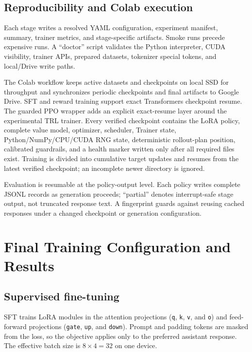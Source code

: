 \documentclass[11pt]{article}
\newcommand{\trl}{\textsc{TRL}}
\begin{document}
\subsection{Reproducibility and Colab execution}

Each stage writes a resolved YAML configuration, experiment manifest, summary,
trainer metrics, and stage-specific artifacts. Smoke runs precede expensive
runs. A ``doctor'' script validates the Python interpreter, CUDA visibility,
trainer APIs, prepared datasets, tokenizer special tokens, and local/Drive
write paths.

The Colab workflow keeps active datasets and checkpoints on local SSD for
throughput and synchronizes periodic checkpoints and final artifacts to Google
Drive. SFT and reward training support exact Transformers checkpoint resume.
The guarded PPO wrapper adds an explicit exact-resume layer around the
experimental \trl{} trainer. Every verified checkpoint contains the LoRA policy,
complete value model, optimizer, scheduler, Trainer state, Python/NumPy/CPU/CUDA
RNG state, deterministic rollout-plan position, calibrated guardrails, and a
health marker written only after all required files exist. Training is divided
into cumulative target updates and resumes from the latest verified checkpoint;
an incomplete newer directory is ignored.

Evaluation is resumable at the policy-output level. Each policy writes
complete JSONL records as generation proceeds; ``partial'' denotes
interrupt-safe stage output, not truncated response text. A fingerprint guards
against reusing cached responses under a changed checkpoint or generation
configuration.

\section{Final Training Configuration and Results}

\subsection{Supervised fine-tuning}

SFT trains LoRA modules in the attention projections
(\texttt{q}, \texttt{k}, \texttt{v}, and \texttt{o}) and feed-forward
projections (\texttt{gate}, \texttt{up}, and \texttt{down}). Prompt and
padding tokens are masked from the loss, so the objective applies only to the
preferred assistant response. The effective batch size is $8\times4=32$ on
one device.
\end{document}
